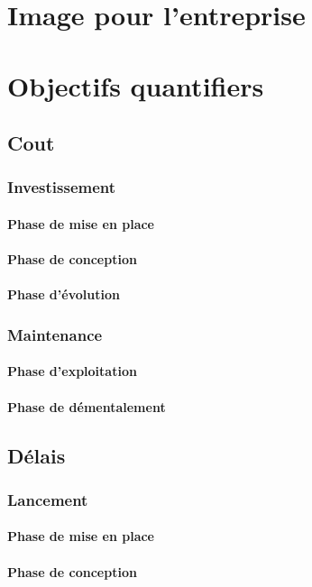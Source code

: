 \section{Image pour l'entreprise}
\section{Objectifs quantifiers}
	\subsection{Cout}
		\subsubsection{Investissement}
			\paragraph{Phase de mise en place}
			\paragraph{Phase de conception}
			\paragraph{Phase d'évolution}
		\subsubsection{Maintenance}
			\paragraph{Phase d'exploitation}
			\paragraph{Phase de démentalement}
	\subsection{Délais}
		\subsubsection{Lancement}
			\paragraph{Phase de mise en place}
			\paragraph{Phase de conception}
